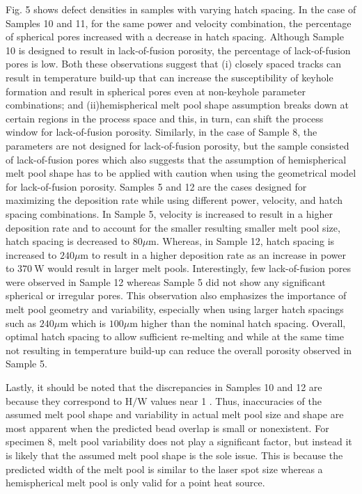 \documentclass[10pt]{article}
\begin{document}
Fig. 5 shows defect densities in samples with varying hatch spacing. In the case of Samples 10 and 11, for the same power and velocity combination, the percentage of spherical pores increased with a decrease in hatch spacing. Although Sample 10 is designed to result in lack-of-fusion porosity, the percentage of lack-of-fusion pores is low. Both these observations suggest that (i) closely spaced tracks can result in temperature build-up that can increase the susceptibility of keyhole formation and result in spherical pores even at non-keyhole parameter combinations; and (ii)hemispherical melt pool shape assumption breaks down at certain regions in the process space and this, in turn, can shift the process window for lack-of-fusion porosity. Similarly, in the case of Sample 8, the parameters are not designed for lack-of-fusion porosity, but the sample consisted of lack-of-fusion pores which also suggests that the assumption of hemispherical melt pool shape has to be applied with caution when using the geometrical model for lack-of-fusion porosity. Samples 5 and 12 are the cases designed for maximizing the deposition rate while using different power, velocity, and hatch spacing combinations. In Sample 5, velocity is increased to result in a higher deposition rate and to account for the smaller resulting smaller melt pool size, hatch spacing is decreased to $80 \mu \mathrm{m}$. Whereas, in Sample 12, hatch spacing is increased to $240 \mu \mathrm{m}$ to result in a higher deposition rate as an increase in power to $370 \mathrm{~W}$ would result in larger melt pools. Interestingly, few lack-of-fusion pores were observed in Sample 12 whereas Sample 5 did not show any significant spherical or irregular pores. This observation also emphasizes the importance of melt pool geometry and variability, especially when using larger hatch spacings such as $240 \mu \mathrm{m}$ which is $100 \mu \mathrm{m}$ higher than the nominal hatch spacing. Overall, optimal hatch spacing to allow sufficient re-melting and while at the same time not resulting in temperature build-up can reduce the overall porosity observed in Sample 5.

Lastly, it should be noted that the discrepancies in Samples 10 and 12 are because they correspond to $\mathrm{H} / \mathrm{W}$ values near 1 . Thus, inaccuracies of the assumed melt pool shape and variability in actual melt pool size and shape are most apparent when the predicted bead overlap is small or nonexistent. For specimen 8, melt pool variability does not play a significant factor, but instead it is likely that the assumed melt pool shape is the sole issue. This is because the predicted width of the melt pool is similar to the laser spot size whereas a hemispherical melt pool is only valid for a point heat source.
\end{document}
